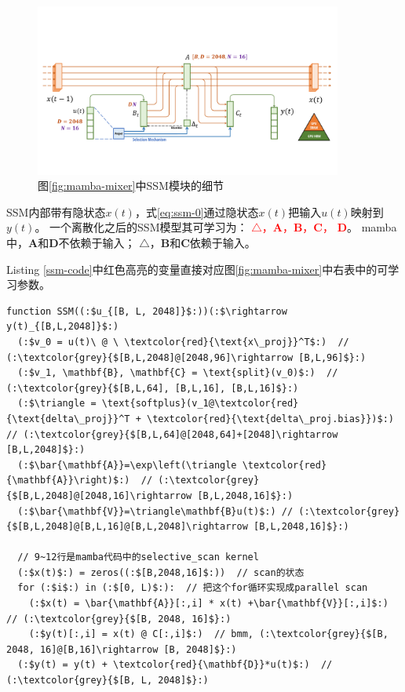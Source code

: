 \begin{figure}[h]
  \centering
  \includegraphics[width=0.9\textwidth]{figures/mamba-ssm.pdf}
  \caption{图\ref{fig:mamba-mixer}中SSM模块的细节}\label{fig:mamba-ssm}
\end{figure}

SSM内部带有隐状态$x(t)$，式\eqref{eq:ssm-0}通过隐状态$x(t)$把输入$u(t)$映射到$y(t)$。
一个离散化之后的SSM模型其可学习为：
\textcolor{red}{$\triangle$，$\mathbf{A}$，$\mathbf{B}$，$\mathbf{C}$，
$\mathbf{D}$}。
mamba中，$\mathbf{A}$和$\mathbf{D}$不依赖于输入；
$\mathbf{\triangle}$，$\mathbf{B}$和$\mathbf{C}$依赖于输入。

Listing \ref{ssm-code}中红色高亮的变量直接对应图\ref{fig:mamba-mixer}中右表中的可学习参数。

\begin{lstlisting}[language=cplus, caption={ssm in mamba},label={parallel-scan-mamba}, label={ssm-code}]
function SSM((:$u_{[B, L, 2048]}$:))(:$\rightarrow y(t)_{[B,L,2048]}$:)
  (:$v_0 = u(t)\ @ \ \textcolor{red}{\text{x\_proj}}^T$:)  // (:\textcolor{grey}{$[B,L,2048]@[2048,96]\rightarrow [B,L,96]$}:)
  (:$v_1, \mathbf{B}, \mathbf{C} = \text{split}(v_0)$:)  // (:\textcolor{grey}{$[B,L,64], [B,L,16], [B,L,16]$}:)
  (:$\triangle = \text{softplus}(v_1@\textcolor{red}{\text{delta\_proj}}^T + \textcolor{red}{\text{delta\_proj.bias}})$:) // (:\textcolor{grey}{$[B,L,64]@[2048,64]+[2048]\rightarrow [B,L,2048]$}:)
  (:$\bar{\mathbf{A}}=\exp\left(\triangle \textcolor{red}{\mathbf{A}}\right)$:)  // (:\textcolor{grey}{$[B,L,2048]@[2048,16]\rightarrow [B,L,2048,16]$}:)
  (:$\bar{\mathbf{V}}=\triangle\mathbf{B}u(t)$:) // (:\textcolor{grey}{$[B,L,2048]@[B,L,16]@[B,L,2048]\rightarrow [B,L,2048,16]$}:)

  // 9~12行是mamba代码中的selective_scan kernel
  (:$x(t)$:) = zeros((:$[B,2048,16]$:))  // scan的状态
  for (:$i$:) in (:$[0, L)$:):  // 把这个for循环实现成parallel scan
    (:$x(t) = \bar{\mathbf{A}}[:,i] * x(t) +\bar{\mathbf{V}}[:,i]$:)  // (:\textcolor{grey}{$[B, 2048, 16]$}:)
    (:$y(t)[:,i] = x(t) @ C[:,i]$:)  // bmm, (:\textcolor{grey}{$[B, 2048, 16]@[B,16]\rightarrow [B, 2048]$}:)
  (:$y(t) = y(t) + \textcolor{red}{\mathbf{D}}*u(t)$:)  // (:\textcolor{grey}{$[B, L, 2048]$}:)
\end{lstlisting}

